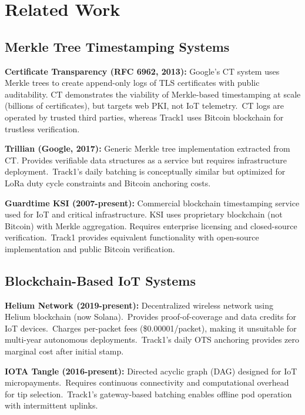 \section{Related Work}

\subsection{Merkle Tree Timestamping Systems}

\textbf{Certificate Transparency (RFC 6962, 2013):} Google's CT system uses Merkle trees to create append-only logs of TLS certificates with public auditability. CT demonstrates the viability of Merkle-based timestamping at scale (billions of certificates), but targets web PKI, not IoT telemetry.\ CT logs are operated by trusted third parties, whereas Track1 uses Bitcoin blockchain for trustless verification.

\textbf{Trillian (Google, 2017):} Generic Merkle tree implementation extracted from CT. Provides verifiable data structures as a service but requires infrastructure deployment.\ Track1's daily batching is conceptually similar but optimized for LoRa duty cycle constraints and Bitcoin anchoring costs.

\textbf{Guardtime KSI (2007-present):} Commercial blockchain timestamping service used for IoT and critical infrastructure. KSI uses proprietary blockchain (not Bitcoin) with Merkle aggregation. Requires enterprise licensing and closed-source verification.\ Track1 provides equivalent functionality with open-source implementation and public Bitcoin verification.

\subsection{Blockchain-Based IoT Systems}

\textbf{Helium Network (2019-present):} Decentralized wireless network using Helium blockchain (now Solana).\ Provides proof-of-coverage and data credits for IoT devices.\ Charges per-packet fees (\$0.00001/packet), making it unsuitable for multi-year autonomous deployments.\ Track1's daily OTS anchoring provides zero marginal cost after initial stamp.

\textbf{IOTA Tangle (2016-present):} Directed acyclic graph (DAG) designed for IoT micropayments.\ Requires continuous connectivity and computational overhead for tip selection.\ Track1's gateway-based batching enables offline pod operation with intermittent uplinks.

